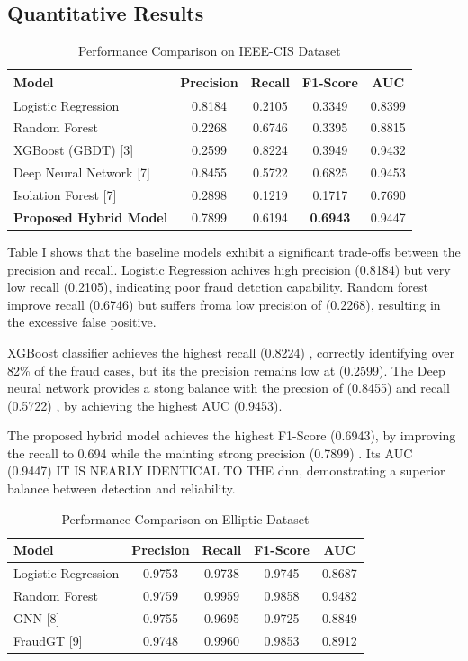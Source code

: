 \documentclass[conference]{IEEEtran}
\begin{document}
\subsection{Quantitative Results}

\begin{table}[h]
\centering
\caption{Performance Comparison on IEEE-CIS Dataset}
\begin{tabular}{lcccc}
\hline
Model & Precision & Recall & F1-Score & AUC \\
\hline
Logistic Regression & 0.8184  & 0.2105 & 0.3349 & 0.8399 \\
Random Forest & 0.2268 & 0.6746 & 0.3395 & 0.8815 \\
XGBoost (GBDT) [3] & 0.2599 & 0.8224 & 0.3949 & 0.9432 \\
Deep Neural Network [7] & 0.8455 & 0.5722 & 0.6825 & 0.9453 \\
Isolation Forest [7] & 0.2898 & 0.1219 & 0.1717 & 0.7690 \\
\textbf{Proposed Hybrid Model} & 0.7899 & 0.6194 & \textbf{0.6943} & 0.9447 \\
\hline
\end{tabular}
\end{table}

Table I shows that the baseline models exhibit a significant trade-offs between the precision and recall. Logistic Regression achives high precision (0.8184) but very low recall (0.2105), indicating poor fraud detction capability. Random forest improve recall (0.6746) but suffers froma low precision of (0.2268), resulting in the excessive false positive.

XGBoost classifier achieves the highest recall (0.8224) , correctly identifying over 82\% of the fraud cases, but its the precision remains low at (0.2599). The Deep neural network provides a stong balance with the precsion of (0.8455) and recall (0.5722) , by achieving the highest AUC (0.9453).

The proposed hybrid model achieves the highest F1-Score (0.6943), by improving the recall to 0.694 while the mainting strong precision (0.7899) . Its AUC (0.9447) IT IS NEARLY IDENTICAL TO THE dnn, demonstrating a superior balance between detection and reliability.


\vspace{0.5em}

\begin{table}[h]
\centering
\caption{Performance Comparison on Elliptic Dataset}
\begin{tabular}{lcccc}
\hline
Model & Precision & Recall & F1-Score & AUC \\
\hline
Logistic Regression & 0.9753 & 0.9738 & 0.9745 & 0.8687 \\
Random Forest & 0.9759 & 0.9959 & 0.9858 & 0.9482 \\
GNN [8] & 0.9755 & 0.9695 & 0.9725 & 0.8849 \\
FraudGT [9] & 0.9748 & 0.9960 & 0.9853 & 0.8912 \\
\hline
\end{tabular}
\end{table}
\end{document}
